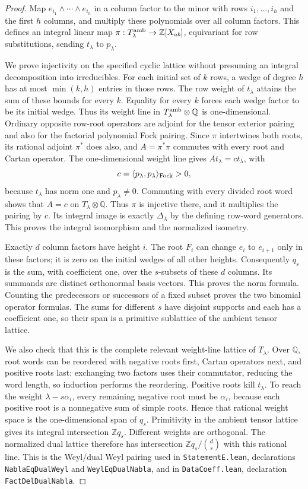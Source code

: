 \documentclass[11pt,a4paper]{article}
\theoremstyle{definition}
\theoremstyle{remark}
\begin{document}
\begin{proof}
Map $e_{i_1}\wedge\cdots\wedge e_{i_h}$ in a column factor to the minor
with rows $i_1,\ldots,i_h$ and the first $h$ columns, and multiply these
polynomials over all column factors. This defines an integral linear map
$\pi:T^{\rm amb}_\lambda\to\mathbb Z[X_{ab}]$, equivariant for row
substitutions, sending $t_\lambda$ to $p_\lambda$.

We prove injectivity on the specified cyclic lattice without presuming
an integral decomposition into irreducibles. For each initial set of
$k$ rows, a wedge of degree $h$ has at most $\min(k,h)$ entries in those
rows. The row weight of $t_\lambda$ attains the sum of these bounds for
every $k$. Equality for every $k$ forces each wedge factor to be its
initial wedge. Thus its weight line in $T^{\rm amb}_\lambda\otimes\mathbb Q$
is one-dimensional. Ordinary opposite row-root operators are adjoint
for the tensor exterior pairing and also for the factorial polynomial
Fock pairing. Since $\pi$ intertwines both roots, its rational adjoint
$\pi^*$ does also, and $A=\pi^*\pi$ commutes with every root and Cartan
operator. The one-dimensional weight line gives
$At_\lambda=c t_\lambda$, with
\[
 c=\langle p_\lambda,p_\lambda\rangle_{\rm Fock}>0,
\]
because $t_\lambda$ has norm one and $p_\lambda\ne0$.
Commuting with every divided root word shows that $A=c$ on
$T_\lambda\otimes\mathbb Q$. Thus $\pi$ is injective there, and it
multiplies the pairing by $c$. Its integral image is exactly
$\Delta_\lambda$ by the defining row-word generators. This proves the
integral isomorphism and the normalized isometry.

Exactly $d$ column factors have height $i$. The root $F_i$ can change
$e_i$ to $e_{i+1}$ only in these factors; it is zero on the initial
wedges of all other heights. Consequently $q_s$ is the sum, with
coefficient one, over the $s$-subsets of these $d$ columns. Its summands
are distinct orthonormal basis vectors. This proves the norm formula.
Counting the predecessors or successors of a fixed subset proves the
two binomial operator formulas. The sums for different $s$ have
disjoint supports and each has a coefficient one, so their span is a
primitive sublattice of the ambient tensor lattice.

We also check that this is the complete relevant weight-line lattice of
$T_\lambda$. Over $\mathbb Q$, root words can be reordered with negative
roots first, Cartan operators next, and positive roots last: exchanging
two factors uses their commutator, reducing the word length, so induction
performs the reordering. Positive roots kill $t_\lambda$. To reach the
weight $\lambda-s\alpha_i$, every remaining negative root must be
$\alpha_i$, because each positive root is a nonnegative sum of simple
roots. Hence that rational weight space is the one-dimensional span
of $q_s$. Primitivity in the ambient tensor lattice gives its integral
intersection $\mathbb Z q_s$. Different weights are orthogonal. The
normalized dual lattice therefore has intersection
$\mathbb Z q_s/\binom ds$ with this rational line. This is the Weyl/dual
Weyl pairing used in \texttt{StatementE.lean}, declarations
\texttt{NablaEqDualWeyl} and \texttt{WeylEqDualNabla}, and in
\texttt{DataCoeff.lean}, declaration \texttt{FactDelDualNabla}.


\end{proof}
\end{document}
